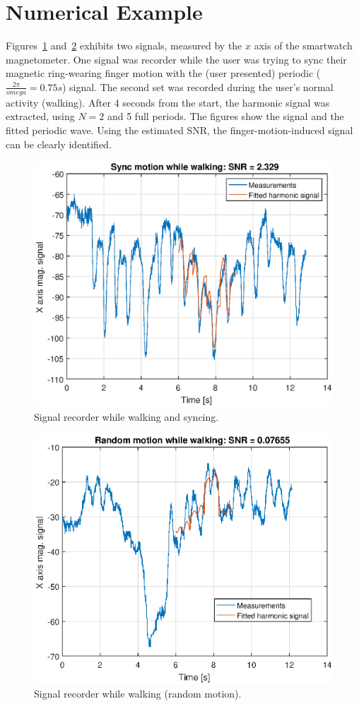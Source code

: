 \documentclass[11pt,letterpaper]{article}
\begin{document}
	\section{Numerical Example}
	Figures~\ref{figXaxisMagSignalWalkingSync} and~\ref{figXaxisMagSignalWalkingNoise}  exhibits two signals, measured by the $x$ axis of the smartwatch magnetometer. One signal was recorder while the user was trying to sync their magnetic ring-wearing finger motion with the (user presented) periodic ($\frac{2\pi}{omega} = 0.75s$) signal. The second set was recorded during the user's normal activity (walking). After 4 seconds from the start, the harmonic signal was extracted, using $N=2$ and 5 full periods. The figures show the signal and the fitted periodic wave. Using the estimated SNR, the finger-motion-induced signal can be clearly identified. 
	
	\begin{figure}[tbph]
		\centering
		\includegraphics[width=0.8\linewidth]{WalkSig}
		\caption{Signal recorder while walking and syncing.}
		\label{figXaxisMagSignalWalkingSync}
	\end{figure}
	\begin{figure}[tbph]
		\centering
		\includegraphics[width=0.8\linewidth]{WalkNoise}
		\caption{Signal recorder while walking (random motion).}
		\label{figXaxisMagSignalWalkingNoise}
	\end{figure}
	
	
	
	
	
	
	
	
	
	
	
	
	
	
\end{document}
